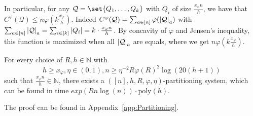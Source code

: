 \begin{rk}
  In particular, for any $\mathcal{Q} = \set{Q_1, \ldots, Q_k}$ with $Q_i$ of size $\frac{x_{\varphi}n}{h}$, we have that $C^{\varphi}(\mathcal{Q}) \leq n\varphi(k\frac{x_{\varphi}}{h})$. Indeed $C^{\varphi}(\mathcal{Q}) = \sum_{a \in [n]} \varphi(\abs{\mathcal{Q}}_a)$ with $\sum_{a \in [n]} \abs{\mathcal{Q}}_a = \sum_{i \in [k]} \abs{Q_i} = k \cdot \frac{x_{\varphi}n}{h}$. By concavity of $\varphi$ and Jensen's inequality, this function is maximized when all $\abs{\mathcal{Q}}_a$ are equals, where we get $n\varphi(k\frac{x_{\varphi}}{h})$.
\end{rk}
\begin{proposition}
  For every choice of $R,h \in \mathbb{N}$ with
  \[h \geq x_{\varphi}, \eta \in (0,1),  n \geq \eta^{-2}R\varphi(R)^2\log(20(h+1)) \]
  such that $\frac{x_{\varphi}n}{h} \in \mathbb{N}$, there exists a $([n],h,R,\varphi,\eta)$-partitioning system, which can be found in time $exp(Rn\log(n))\cdot \text{poly}(h)$.
  \label{prop:Partitioning}
\end{proposition}

The proof can be found in Appendix~\ref{app:Partitioning}.

  
